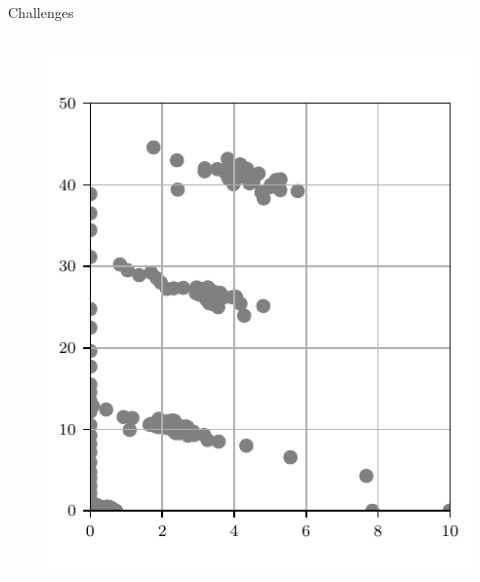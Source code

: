 \documentclass[aspectratio=169]{beamer}
\begin{document}
\begin{frame}{Challenges}
\begin{columns}
\begin{column}{0.38\textwidth}
{\begin{figure}
                    \includegraphics[width=\textwidth]{../ilustrate/pc2023/sample/unlabeled_data.pdf}
                \end{figure}
            }
\end{column}
\end{columns}
\end{frame}
\end{document}

